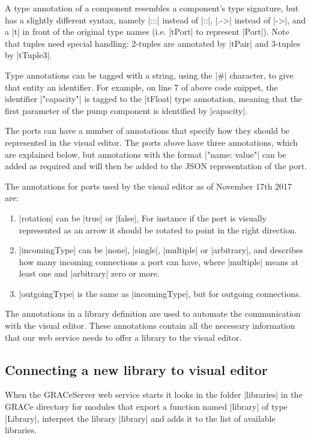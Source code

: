 \documentclass[a4paper]{article}
\begin{document}
A type annotation of a component resembles a component's type signature, but has
a slightly different syntax, namely |:::| instead of |::|, |.->| instead of
|->|, and a |t| in front of the original type names (i.e. |tPort| to represent
|Port|). Note that tuples need special handling: 2-tuples are annotated by
|tPair| and 3-tuples by |tTuple3|.

Type annotations can be tagged with a string,
using the |#| character, to give that entity an identifier.  For example, on
line 7 of above code snippet, the identifier |"capacity"| is tagged to the
|tFloat| type annotation, meaning that the first parameter of the pump component
is identified by |capacity|.

The ports can have a number of annotations that
specify how they should be represented in the visual editor. The ports above
have three annotations, which are explained below, but annotations with the format
|"name: value"| can be added as required and will then be added to the JSON
representation of the port. 

The annotations for ports used by the visual editor as of November 17th 2017 are:
\begin{enumerate}
\item |rotation| can be |true| or |false|, For instance if the port is visually
  represented as an arrow it should be rotated to point in the right direction.
\item |incomingType| can be |none|, |single|, |multiple| or |arbitrary|, and
  describes how many incoming connections a port can have, where |multiple|
  means at least one and |arbitrary| zero or more. 
\item |outgoingType| is the same as |incomingType|, but for outgoing connections.
\end{enumerate}

The annotations in a library definition are used to automate the communication
with the visual editor. These annotations contain all the necessary information
that our web service needs to offer a library to the visual editor. 

\subsection{Connecting a new library to visual editor}
When the GRACeServer web service starts it looks in the folder |libraries| in
the GRACe directory for modules that export a function named |library| of type
|Library|, interpret the library |library| and adds it to the list of available libraries.
\end{document}
